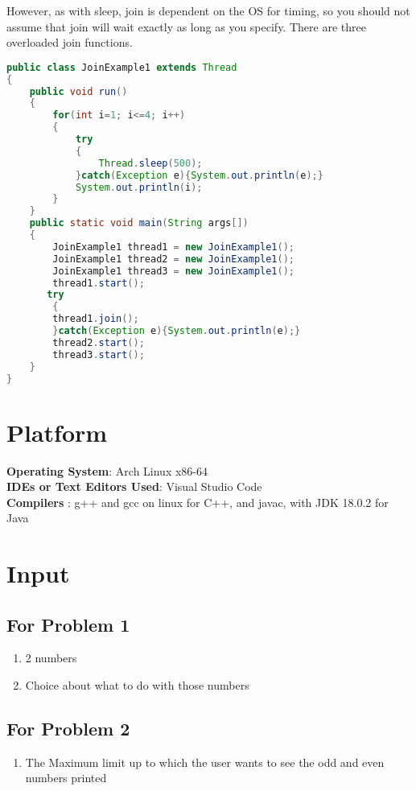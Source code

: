\documentclass[11pt]{article}
\begin{document}
However, as with sleep, join is dependent on the OS for timing, so you should not assume that join will wait exactly as long as you specify.
There are three overloaded join functions.
\begin{lstlisting}[language=Java]
public class JoinExample1 extends Thread  
{    
    public void run()  
    {    
        for(int i=1; i<=4; i++)  
        {    
            try 
            {    
                Thread.sleep(500);    
            }catch(Exception e){System.out.println(e);}    
            System.out.println(i);    
        }    
    }    
    public static void main(String args[])  
    {   
        JoinExample1 thread1 = new JoinExample1();    
        JoinExample1 thread2 = new JoinExample1();    
        JoinExample1 thread3 = new JoinExample1();    
        thread1.start();   
       try 
        {    
        thread1.join();    
        }catch(Exception e){System.out.println(e);}    
        thread2.start();   
        thread3.start();    
    }    
}
\end{lstlisting}
\section{Platform}
\textbf{Operating System}: Arch Linux x86-64 \\
\textbf{IDEs or Text Editors Used}: Visual Studio Code\\
\textbf{Compilers} : g++ and gcc on linux for C++, and javac, with JDK 18.0.2 for Java\\

\section{Input}
\subsection*{For Problem 1}
\begin{enumerate}
	\item 2 numbers
	\item Choice about what to do with those numbers
\end{enumerate}
\subsection*{For Problem 2}
\begin{enumerate}
	\item The Maximum limit up to which the user wants to see the odd and even numbers printed
\end{enumerate}
\end{document}
